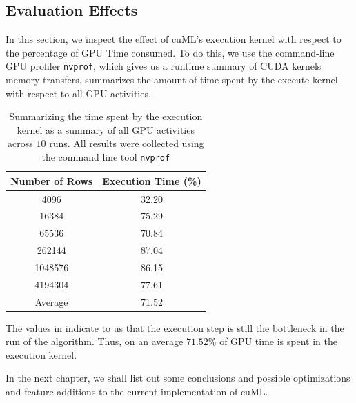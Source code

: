 \subsection{Evaluation Effects}
\label{sec:evaleffects}
In this section, we inspect the effect of cuML's execution kernel with respect to the percentage of GPU Time consumed. To do this, we use the command-line GPU profiler \lstinline!nvprof!, which gives us a runtime summary of CUDA kernels memory transfers.  summarizes the amount of time spent by the execute kernel with respect to all GPU activities. 

\begin{table}[htbp]
  \caption{Summarizing the time spent by the execution kernel as a summary of all GPU activities across $10$ runs. All results were collected using the command line tool \lstinline!nvprof!}
  \begin{center}
    \begin{tabular}[c]{cc}
      \toprule
      \textbf{Number of Rows} & \textbf{Execution Time (\%)} \\
      \midrule
      4096    & 32.20\\
      16384   & 75.29\\
      65536   & 70.84\\
      262144  & 87.04\\ 
      1048576 & 86.15\\
      4194304 & 77.61\\
      \midrule
      Average & 71.52\\
      \bottomrule
    \end{tabular}
    \label{tab:nvprofexec}
  \end{center}
\end{table}

The values in  indicate to us that the execution step is still the bottleneck in the run of the algorithm. Thus, on an average $71.52\%$ of GPU time is spent in the execution kernel.

In the next chapter, we shall list out some conclusions and possible optimizations and feature additions to the current implementation of cuML. 
